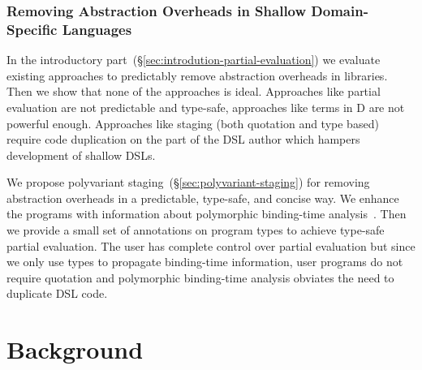 \subsection{Removing Abstraction Overheads in Shallow Domain-Specific Languages}
\label{sec:removing-abstraction-overheads}

 In the introductory part~(\S \ref{sec:introdution-partial-evaluation}) we evaluate existing approaches to predictably remove abstraction overheads in libraries. Then we show that none of
  the approaches is ideal. Approaches like partial evaluation are not predictable and type-safe,
  approaches like  terms in D are not powerful enough. Approaches like staging (both quotation and type based) require code duplication on the part of the DSL author which hampers development of shallow DSLs.

We propose polyvariant staging~(\S \ref{sec:polyvariant-staging}) for removing abstraction
 overheads in a predictable, type-safe, and concise way. We enhance the programs with
 information about polymorphic binding-time analysis~\cite{rytz1992polyvariant}. Then we provide
  a small set of annotations on program types to achieve type-safe partial evaluation.
  The user has complete control over partial evaluation but since we only use types to propagate binding-time information, user programs do not require quotation and polymorphic binding-time analysis obviates the need to duplicate DSL code.




\chapter{Background}
\label{ch:background}

